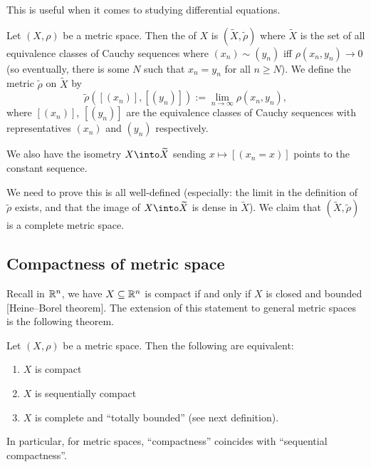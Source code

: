 This is useful when it comes to studying differential equations.

\begin{definition}
Let $(X,\rho)$ be a metric space.
Then the  of $X$ is $(\widetilde{X},\widetilde{\rho})$
where $\widetilde{X}$ is the set of all equivalence classes of Cauchy
sequences where $(x_{n})\sim(y_{n})$ iff $\rho(x_{n},y_{n})\to0$ (so
eventually, there is some $N$ such that $x_{n}=y_{n}$ for all $n\geq N$). We
define the metric $\widetilde{\rho}$ on $\widetilde{X}$ by
\begin{equation}
\widetilde{\rho}([(x_{n})],[(y_{n})]):=\lim_{n\to\infty}\rho(x_{n},y_{n}),
\end{equation}
where $[(x_{n})]$, $[(y_{n})]$ are the equivalence classes of Cauchy
sequences with representatives $(x_{n})$ and $(y_{n})$ respectively.

We also have the isometry $X\into\widetilde{X}$ sending $x\mapsto[(x_{n}=x)]$
points to the constant sequence.

We need to prove this is all well-defined (especially: the limit in
the definition of $\widetilde{\rho}$ exists, and that the image of
$X\into\widetilde{X}$ is dense in $\widetilde{X}$). We claim that
$(\widetilde{X},\widetilde{\rho})$ is a complete metric space.
\end{definition}

\subsection*{Compactness of metric space}

\begin{node}
Recall in $\mathbb{R}^{n}$, we have $X\subseteq\mathbb{R}^{n}$ is compact if and only
if $X$ is closed and bounded [Heine--Borel theorem]. The extension of
this statement to general metric spaces is the following theorem.
\end{node}

\begin{theorem}[Hausdorff]
Let $(X,\rho)$ be a metric space. Then the following are equivalent:
\begin{enumerate}
\item $X$ is compact
\item $X$ is sequentially compact
\item $X$ is complete and ``totally bounded'' (see next definition).
\end{enumerate}
In particular, for metric spaces, ``compactness'' coincides with
``sequential compactness''.
\end{theorem}

